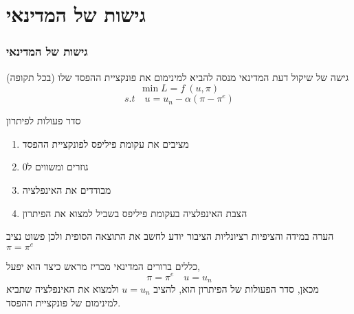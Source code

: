 \documentclass[10pt,usenames,dvipsnames]{beamer}
\begin{document}
\begin{RTL}
\begin{frame}[allowframebreaks]
\begin{center}
            
    \end{center}

\end{frame}
\section{גישות של המדינאי}
\begin{frame}[allowframebreaks]
    \frametitle{גישות של המדינאי}
    \begin{block}{גישה של שיקול דעת}
        המדינאי מנסה להביא למינימום את פונקציית ההפסד שלו (בכל תקופה)
        $$\min L = f \ (u,\pi)$$
        $$s.t \quad u = u_n - \alpha(\pi - \pi^e)$$
    \end{block}
    \begin{exampleblock}{סדר פעולות לפיתרון}
        \begin{enumerate}
            \item מציבים את עקומת פיליפס לפונקציית ההפסד
            \item גוזרים ומשווים ל0
            \item מבודדים את האינפלציה
            \item הצבת האינפלציה  בעקומת פיליפס בשביל למצוא את הפיתרון
        \end{enumerate}
    \end{exampleblock}
    \begin{alertblock}{הערה}
        במידה והציפיות רציונליות הציבור יודע לחשב את התוצאה הסופית ולכן פשוט נציב $\pi = \pi^e$
    \end{alertblock}
    \framebreak
    \begin{block}{כללים ברורים}
        המדינאי מכריז מראש כיצד הוא יפעל, 
        $$\pi = \pi^e \quad u = u_n$$
        מכאן, סדר הפעולות של הפיתרון הוא, להציב $u = u_n$ ולמצוא את האינפלציה שתביא למינימום של פונקציית ההפסד.
    \end{block}
\end{frame}


\end{RTL}
\end{document}

